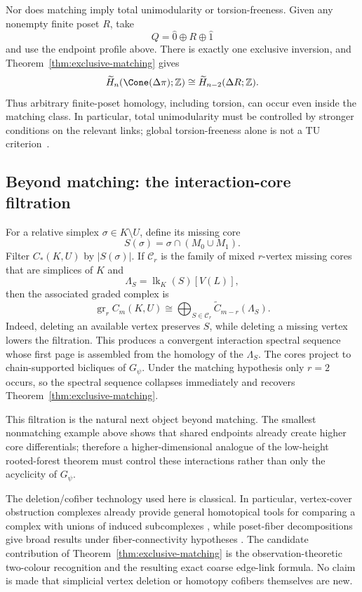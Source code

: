 Nor does matching imply total unimodularity or torsion-freeness.  Given any
nonempty finite poset $R$, take
\[
Q=\hat0\oplus R\oplus\hat1
\]
and use the endpoint profile above.  There is exactly one exclusive inversion,
and Theorem~\ref{thm:exclusive-matching} gives
\[
\widetilde H_n(\Cone(\Delta\pi);\mathbb Z)
\cong
\widetilde H_{n-2}(\Delta R;\mathbb Z).
\]
Thus arbitrary finite-poset homology, including torsion, can occur even inside
the matching class.  In particular, total unimodularity must be controlled by
stronger conditions on the relevant links; global torsion-freeness alone is
not a TU criterion~\cite{DeyHiraniKrishnamoorthy2011}.

\subsection{Beyond matching: the interaction-core filtration}

For a relative simplex $\sigma\in K\setminus U$, define its missing core
\[
S(\sigma)=\sigma\cap(M_0\cup M_1).
\]
Filter $C_*(K,U)$ by $|S(\sigma)|$.  If $\mathcal C_r$ is the family of mixed
$r$-vertex missing cores that are simplices of $K$ and
\[
\Lambda_S=\operatorname{lk}_K(S)[V(L)],
\]
then the associated graded complex is
\begin{equation}
\operatorname{gr}_r C_m(K,U)
\cong
\bigoplus_{S\in\mathcal C_r}
\widetilde C_{m-r}(\Lambda_S).
\label{eq:interaction-graded}
\end{equation}
Indeed, deleting an available vertex preserves $S$, while deleting a missing
vertex lowers the filtration.  This produces a convergent interaction spectral
sequence whose first page is assembled from the homology of the
$\Lambda_S$.  The cores project to chain-supported bicliques of $G_\psi$.
Under the matching hypothesis only $r=2$ occurs, so the spectral sequence
collapses immediately and recovers Theorem~\ref{thm:exclusive-matching}.

This filtration is the natural next object beyond matching.  The smallest
nonmatching example above shows that shared endpoints already create higher
core differentials; therefore a higher-dimensional analogue of the low-height
rooted-forest theorem must control these interactions rather than only the
acyclicity of $G_\psi$.

\begin{remark}
The deletion/cofiber technology used here is classical.  In particular,
vertex-cover obstruction complexes already provide general homotopical tools
for comparing a complex with unions of induced subcomplexes
\cite{ChacholskiEtAl2021}, while poset-fiber decompositions give broad results
under fiber-connectivity hypotheses \cite{BjornerWachsWelker2005}.  The
candidate contribution of Theorem~\ref{thm:exclusive-matching} is the
observation-theoretic two-colour recognition and the resulting exact coarse
edge-link formula.  No claim is made that simplicial vertex deletion or
homotopy cofibers themselves are new.
\end{remark}
